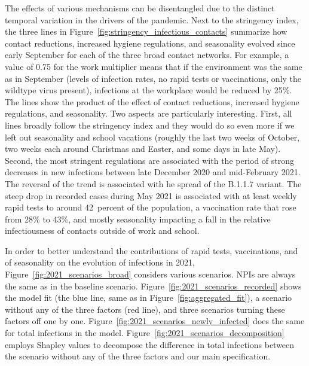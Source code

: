 The effects of various mechanisms can be disentangled due to the distinct temporal
variation in the drivers of the pandemic. Next to the stringency index, the three lines
in Figure~\ref{fig:stringency_infectious_contacts} summarize how contact reductions, increased hygiene
regulations, and seasonality evolved since early September for each of the three broad
contact networks. For example, a value of 0.75 for the work multiplier means that if the
environment was the same as in September (levels of infection rates, no rapid tests or
vaccinations, only the wildtype virus present), infections at the workplace would be
reduced by 25\%. The lines show the product of the effect of contact reductions,
increased hygiene regulations, and seasonality. Two aspects are particularly
interesting. First, all lines broadly follow the stringency index and they would do so
even more if we left out seasonality and school vacations (roughly the last two weeks of
October, two weeks each around Christmas and Easter, and some days in late May). Second,
the most stringent regulations are associated with the period of strong decreases in new
infections between late December 2020 and mid-February 2021. The reversal of the trend
is associated with he spread of the B.1.1.7 variant. The steep drop in recorded cases
during May 2021 is associated with at least weekly rapid tests to around 42~percent of
the population, a vaccination rate that rose from 28\% to 43\%, and mostly seasonality
impacting a fall in the relative infectiousness of contacts outside of work and school.

In order to better understand the contributions  of rapid tests, vaccinations, and of
seasonality on the evolution of infections in 2021, Figure~\ref{fig:2021_scenarios_broad}
considers various scenarios. NPIs are always the same as in the baseline scenario.
Figure~\ref{fig:2021_scenarios_recorded} shows the model fit (the blue line, same as in
Figure~\ref{fig:aggregated_fit}), a scenario without any of the three factors (red line),
and three scenarios turning these factors off one by one.
Figure~\ref{fig:2021_scenarios_newly_infected} does the same for total infections in the
model. Figure~\ref{fig:2021_scenarios_decomposition} employs Shapley values
\citep{Shapley2016} to decompose the difference in total infections between the scenario
without any of the three factors and our main specification.

